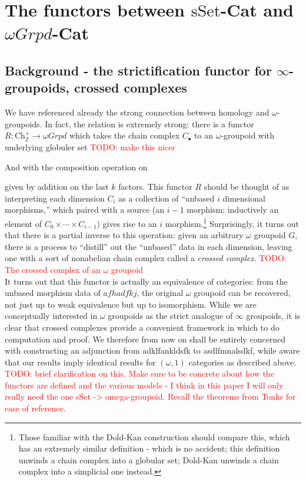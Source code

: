 \documentclass[12pt]{article}
\theoremstyle{definition}
\newcommand{\TODO}[1]{\textcolor{red}{TODO: {#1}}}
\newcommand{\sset}{\text{sSet}}
\newcommand{\ch}{\text{Ch}_\mathbb{Z}^+}
\begin{document}
\section{The functors between $\sset$-Cat and $\omega Grpd$-Cat}
	\subsection{Background - the strictification functor for $\infty$-groupoids, crossed complexes}
		We have referenced already the strong connection between homology and $\omega$-groupoids. In fact, the relation is extremely strong: there is a functor $R: \ch \to \omega Grpd$ which takes the chain complex $C_\bullet$ to an $\omega$-groupoid with underlying globuler set
		\TODO{make this nicer}
		\begin{center}
		\end{center}
		And with the composition operation on
		\begin{center}
		\end{center}
		given by addition on the last $k$ factors. This functor $R$ should be thought of as interpreting each dimension $C_i$ as a collection of ``unbased $i$ dimensional morphisms,'' which paired with a source (an $i-1$ morphism; inductively an element of $C_0 \times \cdots \times C_{i-1}$) gives rise to an $i$ morphism.\footnote{Those familiar with the Dold-Kan construction should compare this, which has an extremely similar definition - which is no accident; this definition unwinds a chain complex into a globular set; Dold-Kan unwinds a chain complex into a simplicial one instead.} Surprisingly, it turns out that there is a partial inverse to this operation: given an arbitrary $\omega$ groupoid $G$, there is a process to ``distill'' out the ``unbased'' data in each dimension, leaving one with a sort of nonabelian chain complex called a \textit{crossed complex}.
		\TODO{The crossed complex of an $\omega$ groupoid} \\
		It turns out that this functor is actually an equivalence of categories: from the unbased morphism data of $afhadfkj$, the original $\omega$ groupoid can be recovered, not just up to weak equivalence but up to isomorphism. While we are conceptually interested in $\omega$ groupoids as the strict analogue of $\infty$ groupoids, it is clear that crossed complexes provide a convenient framework in which to do computation and proof. We therefore from now on shall be entirely concerned with constructing an adjunction from adklfankldsfk to asdlfmnalsdkf, while aware that our results imply identical results for $(\omega,1)$ categories as described above. 
		\TODO{brief clarification on this. Make sure to be concrete about how the functors are defined and the various models - I think in this paper I will only really need the one sSet -> omega-groupoid. Recall the theorems from Tonks for ease of reference.} 
\end{document}
